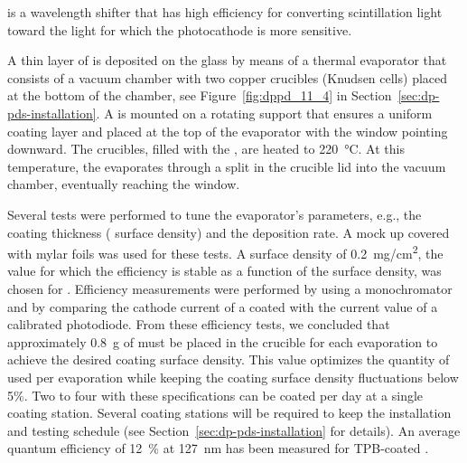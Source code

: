  is a wavelength shifter that has high efficiency for converting \lar scintillation  light toward the light for which the  photocathode is more sensitive. 

A thin layer of  is deposited on the  glass by means of a thermal evaporator that consists of a vacuum chamber with two copper crucibles (Knudsen cells) placed at the bottom of the chamber, see Figure~\ref{fig:dppd_11_4} in Section~\ref{sec:dp-pds-installation}. A  is mounted on a rotating support that ensures a uniform coating layer and placed at the top of the evaporator with the   window pointing downward. The crucibles, filled with the , are heated to \SI{220}{\degreeCelsius}. At this temperature, the  evaporates through a split in the crucible lid into the vacuum chamber, eventually reaching the  window.

Several tests were performed to tune the evaporator's parameters, e.g., the coating thickness ( surface density) and the deposition rate. A  mock up covered with mylar foils was used for these tests. A  surface density of \SI{0.2}{mg/cm^2}, the value for which the  efficiency is stable as a function of the surface density, was chosen for . Efficiency measurements were performed by using a  monochromator and by comparing the cathode current of a coated  with the current value of a calibrated photodiode. From these efficiency tests, we concluded that approximately \SI{0.8}{g} of  must be placed in the crucible for each evaporation to achieve the desired  coating surface density. %
This value optimizes the quantity of  used per evaporation while keeping the coating surface density fluctuations below \num{5}$\%$.  
Two to four   with these specifications can be coated per day at a single coating station. 
Several coating stations will be required to keep the installation and testing schedule (see Section~\ref{sec:dp-pds-installation} for details). An average quantum efficiency of \SI{12}{\%} at \SI{127}{\nano\m} has been measured for TPB-coated  \cite{Bonesini:2018ubd}.


